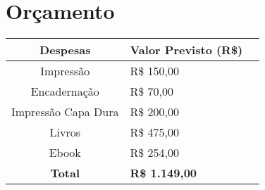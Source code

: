\section{Orçamento}




\begin{small}
\begin{tabular}{clr}
\hline
 Despesas & Valor Previsto (R\$)   \\
\hline
 	Impressão & R\$ 150,00  \\
 	Encadernação & R\$ 70,00  \\
 	Impressão Capa Dura  & R\$ 200,00  \\
 	Livros  & R\$ 475,00  \\ 
 	Ebook  & R\$ 254,00  \\ \hline
 	\textbf{Total} & \textbf{R\$ 1.149,00} \\
\hline
\end{tabular}


\end{small}



















